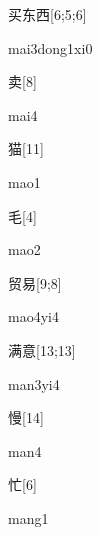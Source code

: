 \begin{verbete}{买东西}[6;5;6]
\begin{pronuncia}{mai3dong1xi0}
\end{pronuncia}
\end{verbete}

\begin{verbete}[mai4]{卖}[8]
\begin{pronuncia}{mai4}
\end{pronuncia}
\end{verbete}

\begin{verbete}[mao1]{猫}[11]
\begin{pronuncia}{mao1}
\end{pronuncia}
\end{verbete}

\begin{verbete}[mao2]{毛}[4]
\begin{pronuncia}{mao2}
\end{pronuncia}
\end{verbete}

\begin{verbete}[mao4yi4]{贸易}[9;8]
\begin{pronuncia}{mao4yi4}
\end{pronuncia}
\end{verbete}

\begin{verbete}[man3yi4]{满意}[13;13]
\begin{pronuncia}{man3yi4}
\end{pronuncia}
\end{verbete}

\begin{verbete}[man4]{慢}[14]
\begin{pronuncia}{man4}
\end{pronuncia}
\end{verbete}

\begin{verbete}[mang1]{忙}[6]
\begin{pronuncia}{mang1}
\end{pronuncia}
\end{verbete}

